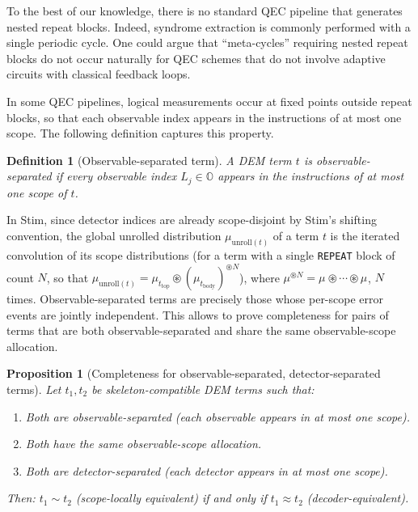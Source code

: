 \documentclass[11pt,a4paper]{article}
\newtheorem{proposition}[theorem]{Proposition}
\newtheorem{definition}[theorem]{Definition}
\newcommand{\dist}[1]{\mu_{#1}}   %
\newcommand{\unroll}{\mathrm{unroll}} %
\begin{document}
To the best of our knowledge, there is no standard QEC pipeline that generates nested repeat blocks. Indeed, syndrome extraction is commonly performed with a single periodic cycle. One could argue that ``meta-cycles'' requiring nested repeat blocks do not occur naturally for QEC schemes that do not involve adaptive circuits with classical feedback loops.

In some QEC pipelines, logical measurements occur at fixed points outside repeat blocks, so that each observable index appears in the instructions of at most one scope. The following definition captures this property.

\begin{definition}[Observable-separated term]
\label{def:obs-separated}
A DEM term $t$ is \emph{observable-separated} if every observable index $L_j \in \mathbb{O}$ appears in the instructions of at most one scope of $t$.
\end{definition}

In Stim, since detector indices are already scope-disjoint by Stim's shifting convention, the global unrolled distribution $\dist{\unroll(t)}$ of a term $t$ is the iterated convolution of its scope distributions (for a term with a single \texttt{REPEAT} block of count $N$, so that $\dist{\unroll(t)} = \dist{t_{\text{top}}} \circledast (\dist{t_{\text{body}}})^{\circledast N}$), where $\dist{}^{\circledast N} = \dist{} \circledast \cdots \circledast \dist{}$, $N$ times. Observable-separated terms are precisely those whose per-scope error events are jointly independent. This allows to prove completeness for pairs of terms that are both observable-separated and share the same observable-scope allocation.

\begin{proposition}[Completeness for observable-separated, detector-separated terms]
\label{prop:completeness}
Let $t_1, t_2$ be skeleton-compatible DEM terms such that:
\begin{enumerate}
  \item Both are observable-separated (each observable appears in at most one scope).
  \item Both have the same observable-scope allocation.
  \item Both are detector-separated (each detector appears in at most one scope).
\end{enumerate}

Then: $t_1 \sim t_2$ (scope-locally equivalent) if and only if 
$t_1 \approx t_2$ (decoder-equivalent).
\end{proposition}
\end{document}
